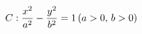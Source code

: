 \documentclass[preview]{standalone}
\begin{document}
\begin{align*}
\special{dvisvgm:raw <g id='unique000'>}C:\frac{x^2}{a^2}-\frac{y^2}{b^2}=1\,(a>0,\,b>0)\special{dvisvgm:raw </g>}
\end{align*}
\end{document}
